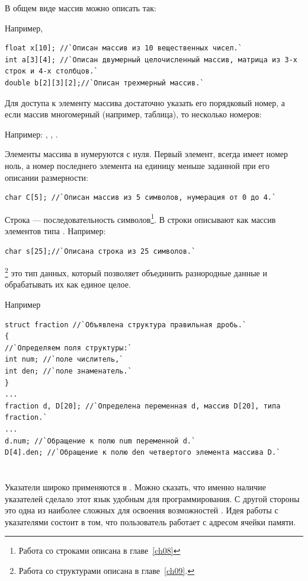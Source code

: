 В общем виде массив можно описать так:


Например,
\begin{lstlisting}
float x[10]; //`Описан массив из 10 вещественных чисел.`
int a[3][4]; //`Описан двумерный целочисленный массив, матрица из 3-х строк и 4-х столбцов.`
double b[2][3][2];//`Описан трехмерный массив.`
\end{lstlisting}
Для доступа к элементу массива достаточно указать его порядковый номер, а если
массив многомерный (например, таблица), то несколько номеров:



Например: , , .

Элементы массива в  нумеруются с нуля. Первый элемент, всегда имеет 
номер ноль, а номер последнего элемента на
единицу меньше заданной при его описании размерности: 
\begin{lstlisting}
char C[5]; //`Описан массив из 5 символов, нумерация от 0 до 4.`
\end{lstlisting}

Строка --- последовательность символов\footnote{Работа со строками описана в главе~\ref{ch08}}. В
 строки описывают как массив элементов типа . Например:
\begin{lstlisting}
char s[25];//`Описана строка из 25 символов.`
\end{lstlisting}
\footnote{Работа со структурами описана в главе~\ref{ch09}.} это тип данных,
который позволяет объединить разнородные данные и обрабатывать их как единое целое.

Например
\begin{lstlisting}
struct fraction //`Объявлена структура правильная дробь.`
{
//`Определяем поля структуры:`
int num; //`поле числитель,`
int den; //`поле знаменатель.`
}
...
fraction d, D[20]; //`Определена переменная d, массив D[20], типа fraction.`
...
d.num; //`Обращение к полю num переменной d.`
D[4].den; //`Обращение к полю den четвертого элемента массива D.`
\end{lstlisting}

\section[Указатели]{}
Указатели широко применяются в . Можно сказать, что именно наличие указателей сделало этот язык
удобным для программирования. С другой стороны это одна из наиболее сложных для освоения возможностей .
Идея работы с указателями состоит в том, что пользователь работает с адресом ячейки памяти.

